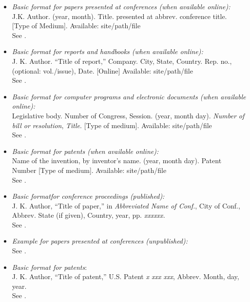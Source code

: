 \documentclass{ieeeaccess}
\begin{document}
\begin{itemize}
    \item \emph{Basic format for papers presented at conferences (when available online): }\\
          J.K. Author. (year, month). Title. presented at abbrev. conference title. [Type of Medium]. Available: site/path/file\\
          See \cite{b17}.

    \item \emph{Basic format for reports and handbooks (when available online):}\\
          J. K. Author. ``Title of report,'' Company. City, State, Country. Rep. no., (optional: vol./issue), Date. [Online] Available: site/path/file\\
          See \cite{b18,b19}.

    \item \emph{Basic format for computer programs and electronic documents (when available online): }\\
          Legislative body. Number of Congress, Session. (year, month day). \emph{Number of bill or resolution}, \emph{Title}. [Type of medium]. Available: site/path/file\\
          See \cite{b20}.

    \item \emph{Basic format for patents (when available online):}\\
          Name of the invention, by inventor's name. (year, month day). Patent Number [Type of medium]. Available: site/path/file\\
          See \cite{b21}.

    \item \emph{Basic format}\emph{for conference proceedings (published):}\\
          J. K. Author, ``Title of paper,'' in \emph{Abbreviated Name of Conf.}, City of Conf., Abbrev. State (if given), Country, year, pp. \emph{xxxxxx.}\\
          See \cite{b22}.

    \item \emph{Example for papers presented at conferences (unpublished):}\\
          See \cite{b23}.

    \item \emph{Basic format for patents}$:$\\
          J. K. Author, ``Title of patent,'' U.S. Patent \emph{x xxx xxx}, Abbrev. Month, day, year.\\
          See \cite{b24}.


\end{itemize}
\end{document}
